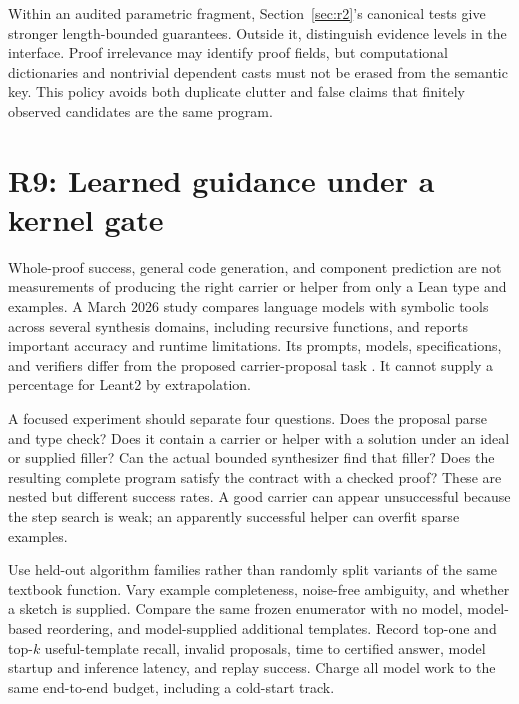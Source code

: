 Within an audited parametric fragment, Section~\ref{sec:r2}'s canonical tests
give stronger length-bounded guarantees. Outside it, distinguish evidence
levels in the interface. Proof irrelevance may identify proof fields, but
computational dictionaries and nontrivial dependent casts must not be erased
from the semantic key. This policy avoids both duplicate clutter and false
claims that finitely observed candidates are the same program.

\section{R9: Learned guidance under a kernel gate}\label{sec:r9}


Whole-proof success, general code generation, and component prediction are not
measurements of producing the right carrier or helper from only a Lean type
and examples. A March 2026 study compares language models with symbolic tools
across several synthesis domains, including recursive functions, and reports
important accuracy and runtime limitations. Its prompts, models, specifications,
and verifiers differ from the proposed carrier-proposal task
\cite{llmsynthesis}. It cannot supply a percentage for Leant2 by extrapolation.

A focused experiment should separate four questions. Does the proposal parse
and type check? Does it contain a carrier or helper with a solution under an
ideal or supplied filler? Can the actual bounded synthesizer find that filler?
Does the resulting complete program satisfy the contract with a checked proof?
These are nested but different success rates. A good carrier can appear
unsuccessful because the step search is weak; an apparently successful helper
can overfit sparse examples.

Use held-out algorithm families rather than randomly split variants of the
same textbook function. Vary example completeness, noise-free ambiguity,
and whether a sketch is supplied. Compare the same frozen enumerator with no
model, model-based reordering, and model-supplied additional templates. Record
top-one and top-$k$ useful-template recall, invalid proposals, time to certified
answer, model startup and inference latency, and replay success. Charge all
model work to the same end-to-end budget, including a cold-start track.

